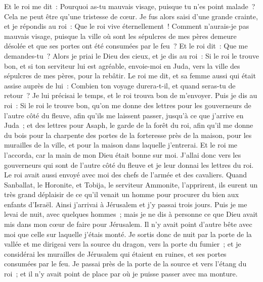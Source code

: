 \begin{multicols}{2}
Et le roi me dit~: Pourquoi as-tu mauvais visage, puisque tu n'es point malade~? Cela ne peut être qu'une tristesse de cœur. Je fus alors saisi d'une grande crainte,
et je répondis au roi~: Que le roi vive éternellement~! Comment n'aurais-je pas mauvais visage, puisque la ville où sont les sépulcres de mes pères demeure désolée et que ses portes ont été consumées par le feu~?
Et le roi dit~: Que me demandes-tu~? Alors je priai le Dieu des cieux,
et je dis au roi~: Si le roi le trouve bon, et si ton serviteur lui est agréable, envoie-moi en Juda, vers la ville des sépulcres de mes pères, pour la rebâtir.
Le roi me dit, et sa femme aussi qui était assise auprès de lui~: Combien ton voyage durera-t-il, et quand seras-tu de retour~? Je lui précisai le temps, et le roi trouva bon de m'envoyer.
Puis je dis au roi~: Si le roi le trouve bon, qu'on me donne des lettres pour les gouverneurs de l'autre côté du fleuve, afin qu'ils me laissent passer, jusqu'à ce que j'arrive en Juda~;
et des lettres pour Asaph, le garde de la forêt du roi, afin qu'il me donne du bois pour la charpente des portes de la forteresse près de la maison, pour les murailles de la ville, et pour la maison dans laquelle j'entrerai. Et le roi me l'accorda, car la main de mon Dieu était bonne sur moi.
J'allai donc vers les gouverneurs qui sont de l'autre côté du fleuve et je leur donnai les lettres du roi. Le roi avait aussi envoyé avec moi des chefs de l'armée et des cavaliers.
Quand Sanballat, le Horonite, et Tobija, le serviteur Ammonite, l'apprirent, ils eurent un très grand déplaisir de ce qu'il venait un homme pour procurer du bien aux enfants d'Israël.
Ainsi j'arrivai à Jérusalem et j'y passai trois jours.
Puis je me levai de nuit, avec quelques hommes~; mais je ne dis à personne ce que Dieu avait mis dans mon cœur de faire pour Jérusalem. Il n'y avait point d'autre bête avec moi que celle sur laquelle j'étais monté.
Je sortis donc de nuit par la porte de la vallée et me dirigeai vers la source du dragon, vers la porte du fumier~; et je considérai les murailles de Jérusalem qui étaient en ruines, et ses portes consumées par le feu.
Je passai près de la porte de la source et vers l'étang du roi~; et il n'y avait point de place par où je puisse passer avec ma monture.

\end{multicols}
